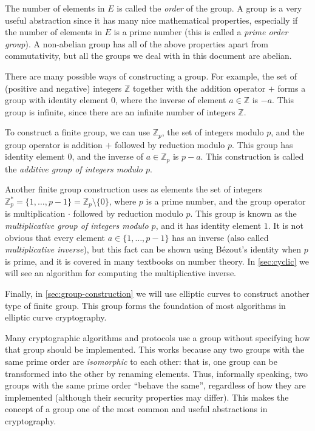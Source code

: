 \documentclass[manuscript]{acmart}
\begin{document}
The number of elements in $E$ is called the \emph{order} of the group.
A group is a very useful abstraction since it has many nice mathematical properties, especially if the number of elements in $E$ is a prime number (this is called a \emph{prime order group}).
A non-abelian group has all of the above properties apart from commutativity, but all the groups we deal with in this document are abelian.

There are many possible ways of constructing a group.
For example, the set of (positive and negative) integers $\mathbb{Z}$ together with the addition operator $+$ forms a group with identity element $0$, where the inverse of element $a \in \mathbb{Z}$ is $-a$.
This group is infinite, since there are an infinite number of integers $\mathbb{Z}$.

To construct a finite group, we can use $\mathbb{Z}_p$, the set of integers modulo $p$, and the group operator is addition $+$ followed by reduction modulo $p$.
This group has identity element $0$, and the inverse of $a \in \mathbb{Z}_p$ is $p-a$.
This construction is called the \emph{additive group of integers modulo $p$}.

Another finite group construction uses as elements the set of integers $\mathbb{Z}_p^* = \{1,\dots, p-1\} = \mathbb{Z}_p \setminus \{0\}$, where $p$ is a prime number, and the group operator is multiplication $\cdot$ followed by reduction modulo $p$.
This group is known as the \emph{multiplicative group of integers modulo $p$}, and it has identity element $1$.
It is not obvious that every element $a \in \{1,\dots, p-1\}$ has an inverse (also called \emph{multiplicative inverse}), but this fact can be shown using Bézout's identity when $p$ is prime, and it is covered in many textbooks on number theory.
In \autoref{sec:cyclic} we will see an algorithm for computing the multiplicative inverse.

Finally, in \autoref{sec:group-construction} we will use elliptic curves to construct another type of finite group.
This group forms the foundation of most algorithms in elliptic curve cryptography.

Many cryptographic algorithms and protocols use a group without specifying how that group should be implemented.
This works because any two groups with the same prime order are \emph{isomorphic} to each other: that is, one group can be transformed into the other by renaming elements.
Thus, informally speaking, two groups with the same prime order ``behave the same'', regardless of how they are implemented (although their security properties may differ).
This makes the concept of a group one of the most common and useful abstractions in cryptography.
\end{document}
